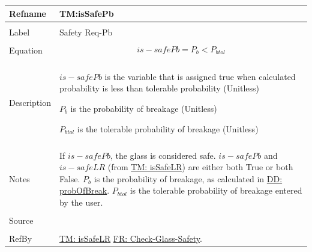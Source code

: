 \documentclass[12pt]{article}
\begin{document}
\noindent \begin{minipage}{\textwidth}
\begin{tabular}{p{} p{}}
\toprule \textbf{Refname} & \textbf{TM:isSafePb}
\label{TM:isSafePb}
\\ \midrule \\
Label & Safety Req-Pb
        \\ \midrule \\
        Equation & \begin{displaymath}
                   is-safePb={P_{b}}<{P_{btol}}
                   \end{displaymath}
                   \\ \midrule \\
                   Description & \begin{symbDescription}
                                 \item{$is-safePb$ is the variable that is assigned true when calculated probability is less than tolerable probability (Unitless)}
                                 \item{${P_{b}}$ is the probability of breakage (Unitless)}
                                 \item{${P_{btol}}$ is the tolerable probability of breakage (Unitless)}
                                 \end{symbDescription}
                                 \\ \midrule \\
                                 Notes & If $is-safePb$, the glass is considered safe. $is-safePb$ and $is-safeLR$ (from \hyperref[TM:isSafeLR]{TM: isSafeLR}) are either both True or both False. ${P_{b}}$ is the probability of breakage, as calculated in \hyperref[DD:probOfBreak]{DD: probOfBreak}. ${P_{btol}}$ is the tolerable probability of breakage entered by the user.
                                         \\ \midrule \\
                                         Source & \cite{astm2009}
                                                  \\ \midrule \\
                                                  RefBy & \hyperref[TM:isSafeLR]{TM: isSafeLR} \hyperref[checkGlassSafety]{FR: Check-Glass-Safety}.
\\ \bottomrule \end{tabular}
\end{minipage}
\par~
\end{document}
